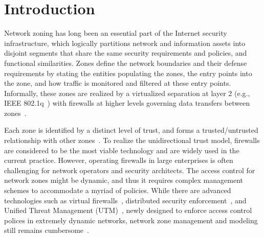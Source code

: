 \chapter{Introduction}
\label{intro}

Network zoning has long been an essential part of the Internet security infrastructure, 
which logically partitions network and information assets into disjoint segments that share the 
same security requirements and policies, and functional similarities. Zones define the network boundaries and their defense 
requirements by stating the entities populating the zones, the entry points into the zone, and
how traffic is monitored and filtered at these entry points. Informally, these zones 
are realized by a virtualized separation at layer 2 (e.g., IEEE 802.1q~\cite{ieee2018vlan}) 
with firewalls at higher levels governing data transfers between zones~\cite{mayer2000fang}. 


Each zone is identified by a distinct level of trust, and 
forms a trusted/untrusted relationship with other zones~\cite{obregon2015infrastructure}.
To realize the unidirectional trust model, firewalls are considered to be the most viable
technology and are widely used in the current practice. However, operating firewalls in 
large enterprises is often challenging for network operators and security architects. The 
access control for network zones might be dynamic, and thus it requires complex 
management schemes to accommodate a myriad of policies. While there are advanced 
technologies such as virtual firewalls~\cite{deng2015vnguard,bakker2016network}, distributed
security enforcement~\cite{markham2001security,yu2017psi}, and Unified
Threat Management (UTM)~\cite{qi2007towards}, newly designed to enforce access control polices in extremely dynamic networks, network zone management and modeling 
still remains cumbersome~\cite{ramasamy2011towards,gontarczyk2015blueprint}.

